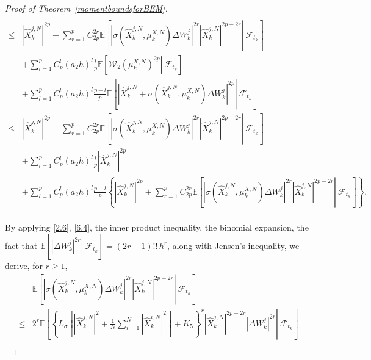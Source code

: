 \documentclass[12pt]{article}
\numberwithin{equation}{section}
\begin{document}
\begin{proof}[Proof of Theorem~\ref{momentboundsforBEM}]
\begin{equation}
\begin{aligned}
\\
\leq&  \left| \hat{X}_{k}^{j,N} \right|^{2p}  +\sum_{r=1}^p{C_{2p}^{2r}\mathbb{E} \left[\left. \left| \sigma \left( \hat{X}_{k}^{j,N},\mu _{k}^{X,N} \right) \Delta W_{k}^{j} \right|^{2r}\left| \hat{X}_{k}^{j,N} \right|^{2p-2r}\right\rvert\ \mathcal{F}_{t_{k}}  \right]}
\\
&+\sum_{l=1}^p{C_{p}^{l}\left( a_2h \right) ^l \tfrac{l}{p}\mathbb{E} \left[\left. \mathcal{W} _2\left( \mu _{k}^{X,N} \right) ^{2p}\right\rvert\ \mathcal{F}_{t_{k}}  \right]} \\
&+\sum_{l=1}^p{C_{p}^{l}\left( a_2h \right) ^l\tfrac{p-l}{p}\mathbb{E} \left[\left. \left| \hat{X}_{k}^{j,N}+\sigma \left( \hat{X}_{k}^{j,N},\mu _{k}^{X,N} \right) \Delta W_{k}^{j} \right|^{2p} \right\rvert\ \mathcal{F}_{t_{k}} \right] }
\\
\leq& \left| \hat{X}_{k}^{j,N} \right|^{2p} +\sum_{r=1}^p{C_{2p}^{2r}\mathbb{E} \left[ \left.\left| \sigma \left( \hat{X}_{k}^{j,N},\mu _{k}^{X,N} \right) \Delta W_{k}^{j} \right|^{2r}\left| \hat{X}_{k}^{j,N} \right|^{2p-2r} \right\rvert\ \mathcal{F}_{t_{k}} \right]}
\\
&+\sum_{l=1}^p{C_{p}^{l}\left( a_2h \right) ^l \tfrac{l}{p} \left| \hat{X}_{k}^{j,N} \right|^{2p} }\\
&+\sum_{l=1}^p{C_{p}^{l}\left( a_2h \right) ^l\tfrac{p-l}{p}\left\{\left| \hat{X}_{k}^{j,N} \right|^{2p}+\sum_{r=1}^p{C_{2p}^{2r}\mathbb{E} \left[ \left.\left| \sigma \left( \hat{X}_{k}^{j,N},\mu _{k}^{X,N} \right) \Delta W_{k}^{j} \right|^{2r}\left| \hat{X}_{k}^{j,N} \right|^{2p-2r}\right\rvert\ \mathcal{F}_{t_{k}}  \right]} \right\}}.
\end{aligned}
\end{equation}\\
By applying \eqref{2.6}, \eqref{6.4}, the inner product inequality, the binomial expansion, the fact  that $\mathbb{E} \left[ \left.\left|\Delta W_{k}^j\right|^{2r}\right\rvert\ \mathcal{F}_{t_k} \right] = \left(2r - 1\right)!! \, h^r$, along with Jensen's inequality, we derive, for $r \geq 1$,
 \begin{equation}\tag{5.115}\label{6.11}
\begin{aligned}
&\mathbb{E} \left[\left. \left| \sigma \left( \hat{X}_{k}^{j,N},\mu _{k}^{X,N} \right) \Delta W_{k}^{j} \right|^{2r}\left| \hat{X}_{k}^{j,N} \right|^{2p-2r}\right\rvert\ \mathcal{F} _{t_k} \right]\\
\le &2^r\mathbb{E} \left[\left. \left\{ L_{\sigma}\left[ \left|\hat{X}_{k}^{j,N}\right|^2+\tfrac{1}{N}\sum_{i=1}^N{\left|\hat{X}_{k}^{i,N}\right|^2} \right] +K_5 \right\} ^r\left| \hat{X}_{k}^{j,N} \right|^{2p-2r}\left| \Delta W_{k}^{j} \right|^{2r}\right\rvert\ \mathcal{F} _{t_k} \right]\\

\end{aligned}
\end{equation}
\end{proof}
\end{document}
